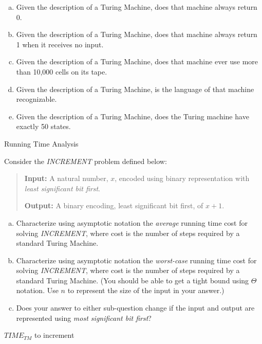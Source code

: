 \documentclass[11pt]{article}
\begin{document}
\begin{enumerate}[(a)]
    \item Given the description of a Turing Machine, does that machine always return 0.
    \item Given the description of a Turing Machine, does that machine always return 1 when it receives no input.
    \item Given the description of a Turing Machine, does that machine ever use more than 10,000 cells on its tape.
    \item Given the description of a Turing Machine, is the language of that machine recognizable.
    \item Given the description of a Turing Machine, does the Turing machine have exactly 50 states.
\end{enumerate}

\directions{\clearpage}

\begin{problem}
Running Time Analysis
\end{problem}

Consider the \emph{INCREMENT} problem defined below:
\begin{quote}
    {\bf Input:} A natural number, $x$, encoded using binary representation with \emph{least significant bit first}. 
    
    {\bf Output:} A binary encoding, least significant bit first, of $x + 1$.
\end{quote}

\begin{enumerate}[(a)]
\item Characterize using asymptotic notation the \emph{average} running time cost for solving \emph{INCREMENT}, where cost is the number of steps required by a standard Turing Machine. 

\item Characterize using asymptotic notation the \emph{worst-case} running time cost for solving \emph{INCREMENT}, where cost is the number of steps required by a standard Turing Machine. (You should be able to get a tight bound using $\Theta$ notation. Use $n$ to represent the size of the input in your answer.)

\item Does your answer to either sub-question change if the input and output are represented using \emph{most significant bit first}?
\end{enumerate}

\begin{problem}
$\mathit{TIME}_{TM}$ to increment
\end{problem}
\end{document}
